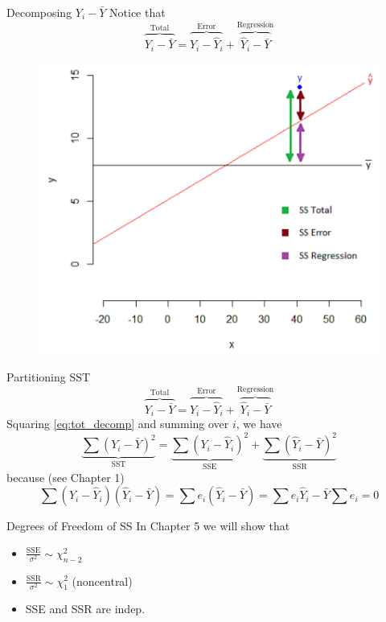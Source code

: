 \documentclass{beamer}
\begin{document}
\begin{frame}{Decomposing $Y_i-\bar{Y}$}
Notice that
$$
\overbrace{Y_i-\bar{Y}}^{\text{Total}} = \overbrace{Y_i-\hat{Y}_i}^{\text{Error}}+\overbrace{\hat{Y}_i-\bar{Y}}^{\text{Regression}}
$$
\begin{figure}
    \centering
    \includegraphics[width=.6\textwidth]{plots/ssto.png}
\end{figure}
\end{frame}

\begin{frame}{Partitioning SST}
\begin{equation}
\overbrace{Y_i-\bar{Y}}^{\text{Total}} = \overbrace{Y_i-\hat{Y}_i}^{\text{Error}}+\overbrace{\hat{Y}_i-\bar{Y}}^{\text{Regression}}\label{eq:tot_decomp}    
\end{equation}
\pause Squaring \eqref{eq:tot_decomp} and summing over $i$, we have
\pause$$
\underbrace{\sum(Y_i-\bar{Y})^2}_{\text{SST}}=\underbrace{\sum(Y_i-\hat{Y}_i)^2}_{\text{SSE}}+\underbrace{\sum(\hat{Y}_i-\bar{Y})^2}_{\text{SSR}}
$$
\pause because (see Chapter 1)
$$
\sum(Y_i-\hat{Y}_i)(\hat{Y}_i-\bar{Y})=\sum e_i(\hat{Y}_i-\bar{Y})=\sum e_i\hat{Y}_i-\bar{Y}\sum e_i=0
$$
\end{frame}

\begin{frame}{Degrees of Freedom of SS}
In Chapter 5 we will show that
\begin{itemize}
    \item $\frac{\text{SSE}}{\sigma^2}\sim\chi^2_{n-2}$
    \item<3->$\frac{\text{SSR}}{\sigma^2}\sim\chi^2_1$ (noncentral)
    \item<4->SSE and SSR are indep.
\end{itemize}
\end{frame}
\end{document}
